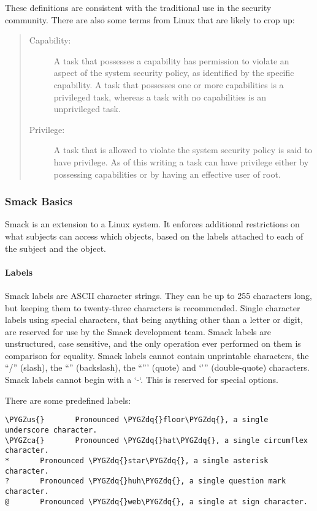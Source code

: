 \documentclass[a4paper,8pt,english]{sphinxmanual}
\def\PYGZus{\char`\_}
\def\PYGZca{\char`\^}
\def\PYGZdq{\char`\"}
\begin{document}
These definitions are consistent with the traditional use in the security
community. There are also some terms from Linux that are likely to crop up:
\begin{quote}
\begin{description}
\item[{Capability:}] \leavevmode
A task that possesses a capability has permission to
violate an aspect of the system security policy, as identified by
the specific capability. A task that possesses one or more
capabilities is a privileged task, whereas a task with no
capabilities is an unprivileged task.

\item[{Privilege:}] \leavevmode
A task that is allowed to violate the system security
policy is said to have privilege. As of this writing a task can
have privilege either by possessing capabilities or by having an
effective user of root.

\end{description}
\end{quote}


\subsubsection{Smack Basics}
\label{admin-guide/LSM/Smack:smack-basics}
Smack is an extension to a Linux system. It enforces additional restrictions
on what subjects can access which objects, based on the labels attached to
each of the subject and the object.


\paragraph{Labels}
\label{admin-guide/LSM/Smack:labels}
Smack labels are ASCII character strings. They can be up to 255 characters
long, but keeping them to twenty-three characters is recommended.
Single character labels using special characters, that being anything
other than a letter or digit, are reserved for use by the Smack development
team. Smack labels are unstructured, case sensitive, and the only operation
ever performed on them is comparison for equality. Smack labels cannot
contain unprintable characters, the ``/'' (slash), the ``'' (backslash), the ``'''
(quote) and `''' (double-quote) characters.
Smack labels cannot begin with a `-`. This is reserved for special options.

There are some predefined labels:

\begin{Verbatim}[commandchars=\\\{\}]
\PYGZus{}       Pronounced \PYGZdq{}floor\PYGZdq{}, a single underscore character.
\PYGZca{}       Pronounced \PYGZdq{}hat\PYGZdq{}, a single circumflex character.
*       Pronounced \PYGZdq{}star\PYGZdq{}, a single asterisk character.
?       Pronounced \PYGZdq{}huh\PYGZdq{}, a single question mark character.
@       Pronounced \PYGZdq{}web\PYGZdq{}, a single at sign character.
\end{Verbatim}
\end{document}
